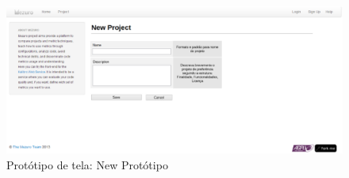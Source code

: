 \begin{figure}[H]
  \begin{center}
    \includegraphics[width=1\textwidth]{figuras/NewProject.eps}
    \caption{Protótipo de tela: New Protótipo}
    \label{fig:pNewPrototipo}
  \end{center}
\end{figure}